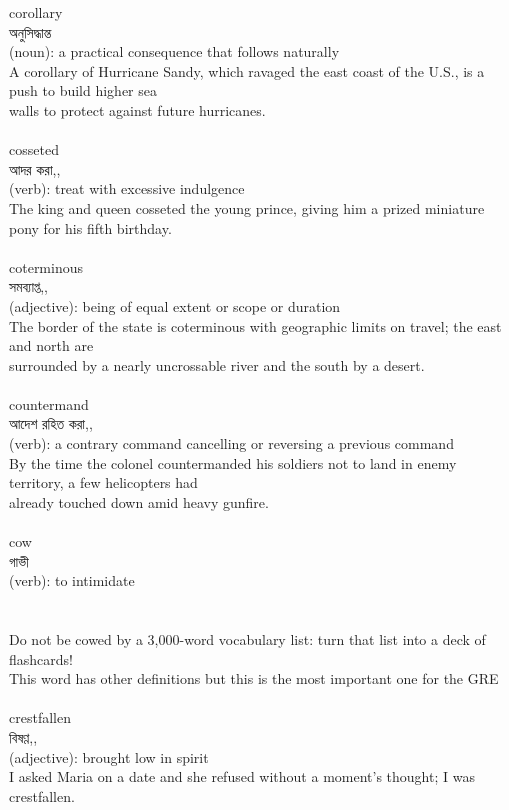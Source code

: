\documentclass{article}
\begin{document}
{corollary}\\
{অনুসিদ্ধান্ত}\\
{(noun): a practical consequence that follows naturally\\A corollary of Hurricane Sandy, which ravaged the east coast of the U.S., is a push to build higher sea\\walls to protect against future hurricanes.\\}\\
{cosseted}\\
{আদর করা,,}\\
{(verb): treat with excessive indulgence\\The king and queen cosseted the young prince, giving him a prized miniature pony for his fifth birthday.\\}\\
{coterminous}\\
{সমব্যাপ্ত,,}\\
{(adjective): being of equal extent or scope or duration\\The border of the state is coterminous with geographic limits on travel; the east and north are\\surrounded by a nearly uncrossable river and the south by a desert.\\}\\
{countermand}\\
{আদেশ রহিত করা,,}\\
{(verb): a contrary command cancelling or reversing a previous command\\By the time the colonel countermanded his soldiers not to land in enemy territory, a few helicopters had\\already touched down amid heavy gunfire.\\}\\
{cow}\\
{গাভী}\\
{(verb): to intimidate\\\\                                                                               \\Do not be cowed by a 3,000-word vocabulary list: turn that list into a deck of flashcards!\\This word has other definitions but this is the most important one for the GRE\\}\\
{crestfallen}\\
{বিষণ্ণ,,}\\
{(adjective): brought low in spirit\\I asked Maria on a date and she refused without a moment's thought; I was crestfallen.\\}\\
\end{document}
